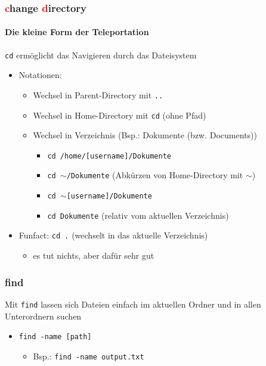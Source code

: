 \documentclass[12pt,utf8]{beamer}
\begin{document}
\begin{frame}
\frametitle{\textcolor{red}{c}hange \textcolor{red}{d}irectory}
\framesubtitle{\textcolor{ownDarkOr}{Die kleine Form der Teleportation}}
\texttt{cd} ermöglicht das Navigieren durch das Dateisystem
\begin{itemize}
	\item Notationen:	
	\begin{itemize}[<+->]
		\item Wechsel in Parent-Directory mit \texttt{..}
		\item Wechsel in Home-Directory mit \texttt{cd}   (ohne Pfad)
		\item Wechsel in Verzeichnis (Bsp.: Dokumente (bzw. Documents))
		\begin{itemize}[<+->]
			\item \texttt{cd /home/[username]/Dokumente}
			\item \texttt{cd $\sim$/Dokumente}   (Abkürzen von Home-Directory mit $\sim$)
			\item \texttt{cd $\sim$[username]/Dokumente}
			\item \texttt{cd Dokumente}    (relativ vom aktuellen Verzeichnis)
		\end{itemize}
	\end{itemize}
	\item Funfact: \texttt{cd .}  (wechselt in das aktuelle Verzeichnis)
	\begin{itemize}
		\item es tut nichts, aber dafür sehr gut
	\end{itemize}
\end{itemize}
\end{frame}

\begin{frame}
	\frametitle{find}
	Mit \texttt{find} lassen sich Dateien einfach im aktuellen Ordner und in allen Unterordnern suchen
	\begin{itemize}
		\item \texttt{find -name [path]}
		\begin{itemize}[<+->]
			\item Bsp.: \texttt{find -name output.txt}
		\end{itemize}
	\end{itemize}
\end{frame}
\end{document}

